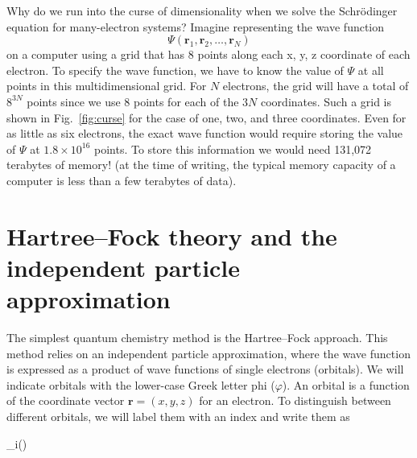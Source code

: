 \documentclass[../Main/chem371-notes.tex]{subfiles}
\begin{document}
Why do we run into the curse of dimensionality when we solve the Schr\"{o}dinger equation for many-electron systems?
Imagine representing the wave function
\begin{equation}
\Psi(\mathbf{r}_1, \mathbf{r}_2, \ldots, \mathbf{r}_N)
\end{equation}
on a computer using a grid that has 8 points along each x, y, z coordinate of each electron.
To specify the wave function, we have to know the value of $\Psi$ at all points in this multidimensional grid.
For $N$ electrons, the grid will have a total of $8^{3N}$ points since we use 8 points for each of the $3N$ coordinates.
Such a grid is shown in Fig.~\ref{fig:curse} for the case of one, two, and three coordinates.
Even for as little as six electrons, the exact wave function would require storing the value of $\Psi$ at $1.8 \times 10^{16}$ points. To store this information we would need 131,072 terabytes of memory! (at the time of writing, the typical memory capacity of a computer is less than a few terabytes of data).

\section{Hartree--Fock theory and the independent particle approximation}
The simplest quantum chemistry method is the Hartree--Fock approach.
This method relies on an independent particle approximation, where the wave function is expressed as a product of wave functions of single electrons (orbitals).
We will indicate orbitals with the lower-case Greek letter phi ($\varphi$).
An orbital is a function of the coordinate vector $\mathbf{r} = (x,y,z)$ for an electron.
To distinguish between different orbitals, we will label them with an index and write them as
\begin{iequation}
\varphi_i()
\end{iequation}
\end{document}
